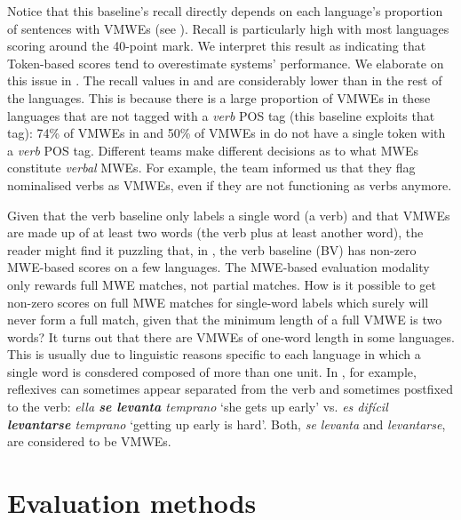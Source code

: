 \documentclass[output=paper,modfonts,nonflat,draftmode]{langsci/langscibook}
\begin{document}
Notice that this baseline's recall directly depends on each language's proportion of sentences with VMWEs (see ). Recall is particularly high with most languages scoring around the 40-point mark. We interpret this result as indicating that Token-based scores tend to overestimate systems' performance. We elaborate on this issue in . The recall values in  and  are considerably lower than in the rest of the languages. This is because there is a large proportion of VMWEs in these languages that are not tagged with a \emph{verb} POS tag (this baseline exploits that tag): 74\% of VMWEs in  and 50\% of VMWEs in  do not have a single token with a \emph{verb} POS tag. Different teams make different decisions as to what MWEs constitute \emph{verbal} MWEs. For example, the  team informed us that they flag nominalised verbs as VMWEs, even if they are not functioning as verbs anymore.

Given that the verb baseline only labels a single word (a verb) and that VMWEs are made up of at least two words (the verb plus at least another word), the reader might find it puzzling that, in , the verb baseline (BV) has non-zero MWE-based scores on a few languages. The MWE-based evaluation modality only rewards full MWE matches, not partial matches. How is it possible to get non-zero scores on full MWE matches for single-word labels which surely will never form a full match, given that the minimum length of a full VMWE is two words? It turns out that there are VMWEs of one-word length in some languages. This is usually due to linguistic reasons specific to each language in which a single word is consdered composed of more than one unit. In , for example, reflexives can sometimes appear separated from the verb and sometimes postfixed to the verb: \emph{ella \textbf{se \mbox{levanta}} \mbox{temprano}} `she gets up early' vs. \emph{es \mbox{difícil} \textbf{\mbox{levantarse}} \mbox{temprano}} `getting up early is hard'. Both, \emph{se levanta} and \emph{levantarse}, are considered to be VMWEs. 



\section{\label{sec:eval-methods}Evaluation methods}
\end{document}
